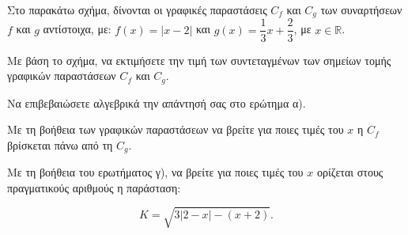 {
Στο παρακάτω σχήμα, δίνονται οι γραφικές παραστάσεις $C_{f}$ και $C_{g}$ των συναρτήσεων $f$ και $g$ αντίστοιχα, με:
$f(x) = |x - 2|$ και $g(x) = \dfrac{1}{3}x + \dfrac{2}{3}$, με $x\mathbb{\in R}$.
\begin{alist}
\item Με βάση το σχήμα, να εκτιμήσετε την τιμή των συντεταγμένων των σημείων τομής γραφικών παραστάσεων $C_{f}$ και $C_{g}$.

\item Να επιβεβαιώσετε αλγεβρικά την απάντησή σας στο ερώτημα α).
\item Με τη βοήθεια των γραφικών παραστάσεων να βρείτε για ποιες τιμές του $x$ η $C_{f}$ βρίσκεται πάνω από τη $C_{g}$.
\item Με τη βοήθεια του ερωτήματος γ), να βρείτε για ποιες τιμές του $x$ ορίζεται στους πραγματικούς αριθμούς η παράσταση:

\begin{equation*}K = \sqrt{3|2 - x| - (x + 2)}.\end{equation*}
\end{alist}}


